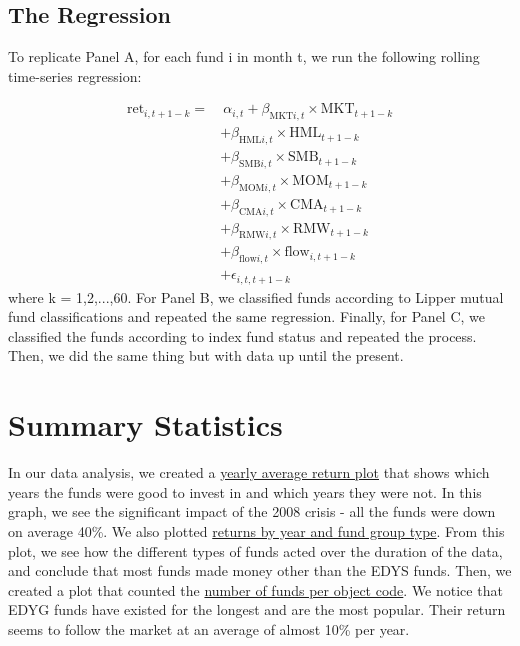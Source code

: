 \documentclass{article}
\begin{document}
\subsection{The Regression}
To replicate Panel A, for each fund i in month t, we run the following rolling time-series regression:

\begin{align*}
    \text{ret}_{i,t+1-k} = & \ \alpha_{i,t} + \beta_{\text{MKT} i,t} \times \text{MKT}_{t+1-k} \\
    & + \beta_{\text{HML} i,t} \times \text{HML}_{t+1-k} \\
    & + \beta_{\text{SMB} i,t} \times \text{SMB}_{t+1-k} \\
    & + \beta_{\text{MOM} i,t} \times \text{MOM}_{t+1-k} \\
    & + \beta_{\text{CMA} i,t} \times \text{CMA}_{t+1-k} \\
    & + \beta_{\text{RMW} i,t} \times \text{RMW}_{t+1-k} \\
    & + \beta_{\text{flow} i,t} \times \text{flow}_{i,t+1-k} \\
    & + \epsilon_{i,t,t+1-k}
\end{align*} 
where k = 1,2,...,60. For Panel B, we classified funds according to Lipper mutual fund classifications and 
repeated the same regression. Finally, for Panel C, we classified the funds according to index fund status and 
repeated the process. Then, we did the same thing but with data up until the present. 

\section{Summary Statistics} 

In our data analysis, we created a \hyperref[fig:image1]{yearly average return plot} that shows which years the funds were good
to invest in and which years they were not. In this graph, we see the significant impact of the 2008 crisis
- all the funds were down on average 40\%. 
We also plotted \hyperref[fig:image2]{returns by year and fund group type}. From this plot, we see 
how the different types of funds acted over the duration of the data, and conclude that 
most funds made money other than the EDYS funds. Then, we created a plot that counted the \hyperref[fig:image3]{number 
of funds per object code}. We notice that EDYG funds have existed for the longest and are the most 
popular. Their return seems to follow the market at an average of almost 10\% per year. 
\end{document}
